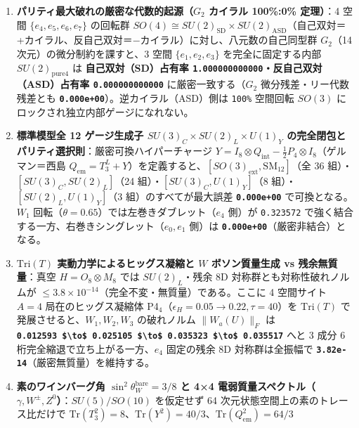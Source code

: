 \documentclass[
  a4paper,
]{ltjsarticle}
\providecommand{\tightlist}{%
  \setlength{\itemsep}{0pt}\setlength{\parskip}{0pt}}
\begin{document}
\begin{enumerate}
\def\labelenumi{\arabic{enumi}.}
\tightlist
\item
  \textbf{パリティ最大破れの厳密な代数的起源（\(G_2\) カイラル 100\%:0\%
  定理）}：4 空間 \(\{e_4,e_5,e_6,e_7\}\) の回転群
  \(SO(4) \cong SU(2)_{\mathrm{SD}} \times SU(2)_{\mathrm{ASD}}\)（自己双対＝+カイラル、反自己双対＝−カイラル）に対し、八元数の自己同型群
  \(G_2\)（14 次元）の微分制約を課すと、3 空間 \(\{e_1,e_2,e_3\}\)
  を完全に固定する内部 \(SU(2)_{\mathrm{pure4}}\) は
  \textbf{自己双対（SD）占有率
  \texttt{1.000000000000}・反自己双対（ASD）占有率
  \texttt{0.000000000000}} に厳密一致する（\(G_2\)
  微分残差・リー代数残差とも
  \textbf{\texttt{0.000e+00}}）。逆カイラル（ASD）側は \texttt{100\%}
  空間回転 \(SO(3)\) にロックされ独立内部ゲージになれない。
\item
  \textbf{標準模型全 12 ゲージ生成子
  \(SU(3)_C \times SU(2)_L \times U(1)_Y\)
  の完全閉包とパリティ選択則}：厳密可換ハイパーチャージ
  \(Y = I_8 \otimes Q_{\mathrm{int}} - \frac{1}{2} P_4 \otimes I_8\)（ゲルマン＝西島
  \(Q_{\mathrm{em}} = T_3^L + Y\)）を定義すると、\([SO(3)_{\mathrm{ext}}, \mathrm{SM}_{12}]\)（全
  36 組）・\([SU(3)_C, SU(2)_L]\)（24 組）・\([SU(3)_C, U(1)_Y]\)（8
  組）・\([SU(2)_L, U(1)_Y]\)（3 組）のすべてが最大誤差
  \textbf{\texttt{0.000e+00}} で可換となる。\(W_1\)
  回転（\(\theta=0.65\)）では左巻きダブレット（\(e_4\) 側）が
  \texttt{0.323572} で強く結合する一方、右巻きシングレット（\(e_0, e_1\)
  側）は \textbf{\texttt{0.000e+00}}（厳密非結合）となる。
\item
  \textbf{\(\mathrm{Tri}(T)\) 実動力学によるヒッグス凝縮と \(W\)
  ボソン質量生成 vs 残余無質量}：真空 \(H = O_8 \otimes M_8\) では
  \(SU(2)_L\)・残余 8D 対称群とも対称性破れノルムが
  \(\le 3.8 \times 10^{-14}\)（完全不変・無質量）である。ここに 4
  空間サイト \(A=4\) 局在のヒッグス凝縮体
  P4\(_4\)（\(\epsilon_H = 0.05 \to 0.22, \tau=40\)）を
  \(\mathrm{Tri}(T)\) で発展させると、\(W_1, W_2, W_3\) の破れノルム
  \(\|W_a(U)\|_F\) は
  \textbf{\texttt{0.012593\ \$\textbackslash{}to\$\ 0.025105\ \$\textbackslash{}to\$\ 0.035323\ \$\textbackslash{}to\$\ 0.035517}}
  へと 3 成分 6 桁完全縮退で立ち上がる一方、\(e_4\) 固定の残余 8D
  対称群は全振幅で \textbf{\texttt{3.82e-14}}（厳密無質量）を維持する。
\item
  \textbf{素のワインバーグ角 \(\sin^2\theta_W^{\mathrm{bare}} = 3/8\) と
  4×4 電弱質量スペクトル（\(\gamma, W^\pm, Z^0\)）}：\(SU(5)/SO(10)\)
  を仮定せず 64 次元状態空間上の素のトレース比だけで
  \(\mathrm{Tr}(T_3^2) = 8\)、\(\mathrm{Tr}(Y^2) = 40/3\)、\(\mathrm{Tr}(Q_{\mathrm{em}}^2) = 64/3\)

\end{enumerate}
\end{document}
